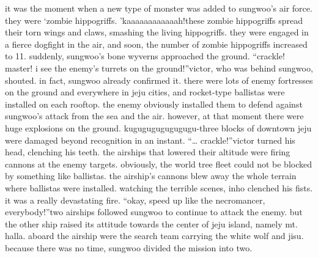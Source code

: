 it was the moment when a new type of monster was added to sungwoo’s air force.
 they were ‘zombie hippogriffs.
’kaaaaaaaaaaaah!these zombie hippogriffs spread their torn wings and claws, smashing the living hippogriffs.
they were engaged in a fierce dogfight in the air, and soon, the number of zombie hippogriffs increased to 11.
suddenly, sungwoo’s bone wyverns approached the ground.
“crackle! master! i see the enemy’s turrets on the ground!”victor, who was behind sungwoo, shouted.
 in fact, sungwoo already confirmed it.
there were lots of enemy fortresses on the ground and everywhere in jeju cities, and rocket-type ballistas were installed on each rooftop.
 the enemy obviously installed them to defend against sungwoo’s attack from the sea and the air.
however, at that moment there were huge explosions on the ground.
kugugugugugugugu-three blocks of downtown jeju were damaged beyond recognition in an instant.
“… crackle!”victor turned his head, clenching his teeth.
 the airships that lowered their altitude were firing cannons at the enemy targets.
 obviously, the world tree fleet could not be blocked by something like ballistas.
 the airship’s cannons blew away the whole terrain where ballistas were installed.
watching the terrible scenes, inho clenched his fists.
 it was a really devastating fire.
“okay, speed up like the necromancer, everybody!”two airships followed sungwoo to continue to attack the enemy.
 but the other ship raised its attitude towards the center of jeju island, namely mt.
 halla.
aboard the airship were the search team carrying the white wolf and jisu.
 because there was no time, sungwoo divided the mission into two.

